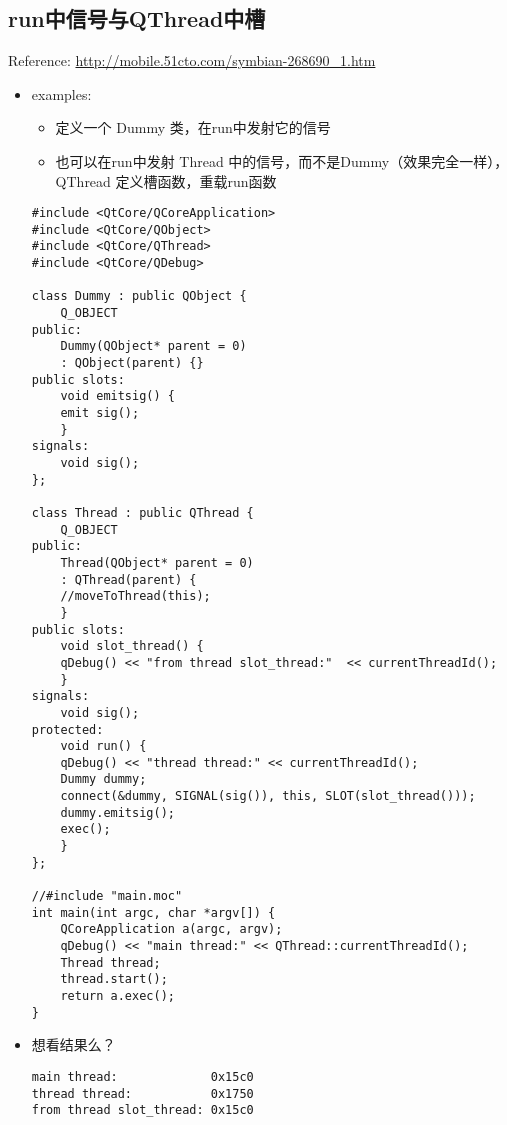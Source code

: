 \documentclass[9pt,b5paper]{article}
\begin{document}
\subsection{run中信号与QThread中槽}
\label{sec-3-4}
Reference: \url{http://mobile.51cto.com/symbian-268690_1.htm}
\begin{itemize}
\item examples:
\begin{itemize}
\item 定义一个 Dummy 类，在run中发射它的信号
\item 也可以在run中发射 Thread 中的信号，而不是Dummy（效果完全一样），QThread 定义槽函数，重载run函数
\end{itemize}
\lstset{language=java,label= ,caption= ,numbers=none}
\begin{lstlisting}
#include <QtCore/QCoreApplication>   
#include <QtCore/QObject>   
#include <QtCore/QThread>   
#include <QtCore/QDebug>    

class Dummy : public QObject {       
    Q_OBJECT
public:
    Dummy(QObject* parent = 0)
	: QObject(parent) {}   
public slots:
    void emitsig() {        
	emit sig();    
    }
signals:
    void sig();
};    

class Thread : public QThread {       
    Q_OBJECT
public:      
    Thread(QObject* parent = 0)
	: QThread(parent) {
	//moveToThread(this);
    }   
public slots:
    void slot_thread() {           
	qDebug() << "from thread slot_thread:"  << currentThreadId();
    }   
signals:
    void sig();
protected:
    void run() {           
	qDebug() << "thread thread:" << currentThreadId();          
	Dummy dummy;           
	connect(&dummy, SIGNAL(sig()), this, SLOT(slot_thread()));          
	dummy.emitsig();
	exec();       
    }   
};    

//#include "main.moc"
int main(int argc, char *argv[]) {       
    QCoreApplication a(argc, argv);       
    qDebug() << "main thread:" << QThread::currentThreadId();       
    Thread thread;       
    thread.start();       
    return a.exec();
}
\end{lstlisting}
\item 想看结果么？

\lstset{language=java,label= ,caption= ,numbers=none}
\begin{lstlisting}
main thread:             0x15c0 
thread thread:           0x1750 
from thread slot_thread: 0x15c0


\end{lstlisting}
\end{itemize}
\end{document}
